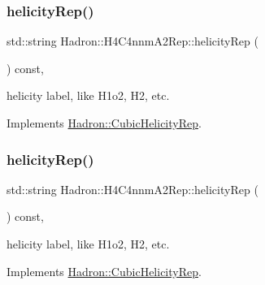 \mbox{\label{structHadron_1_1H4C4nnmA2Rep_a22ac4fc575c83f59d3df9d247a6523a8}} 
\subsubsection{\texorpdfstring{helicityRep()}{helicityRep()}\hspace{0.1cm}{\footnotesize\ttfamily [1/2]}}
{\footnotesize\ttfamily std\+::string Hadron\+::\+H4\+C4nnm\+A2\+Rep\+::helicity\+Rep (\begin{DoxyParamCaption}{ }\end{DoxyParamCaption}) const\hspace{0.3cm}{\ttfamily [inline]}, {\ttfamily [virtual]}}

helicity label, like H1o2, H2, etc. 

Implements \mbox{\hyperlink{structHadron_1_1CubicHelicityRep_af1096946b7470edf0a55451cc662f231}{Hadron\+::\+Cubic\+Helicity\+Rep}}.

\mbox{\label{structHadron_1_1H4C4nnmA2Rep_a22ac4fc575c83f59d3df9d247a6523a8}} 
\subsubsection{\texorpdfstring{helicityRep()}{helicityRep()}\hspace{0.1cm}{\footnotesize\ttfamily [2/2]}}
{\footnotesize\ttfamily std\+::string Hadron\+::\+H4\+C4nnm\+A2\+Rep\+::helicity\+Rep (\begin{DoxyParamCaption}{ }\end{DoxyParamCaption}) const\hspace{0.3cm}{\ttfamily [inline]}, {\ttfamily [virtual]}}

helicity label, like H1o2, H2, etc. 

Implements \mbox{\hyperlink{structHadron_1_1CubicHelicityRep_af1096946b7470edf0a55451cc662f231}{Hadron\+::\+Cubic\+Helicity\+Rep}}.

\mbox{\label{structHadron_1_1H4C4nnmA2Rep_a8a7be6ed1396d06723b3d7891b6ab5a8}} 
